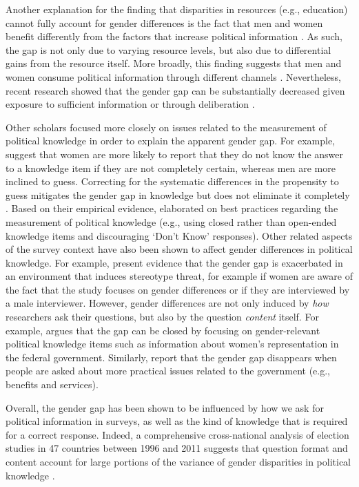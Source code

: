 \documentclass[12pt]{article}
\begin{document}
Another explanation for the finding that disparities in resources (e.g., education) cannot fully account for gender differences is the fact that men and women benefit differently from the factors that increase political information \citep{dow2009gender}. As such, the gap is not only due to varying resource levels, but also due to differential gains from the resource itself. More broadly, this finding suggests that men and women consume political information through different channels \citep[see also][]{pietryka2013analysis}. Nevertheless, recent research showed that the gender gap can be substantially decreased given exposure to sufficient information \citep[e.g.][]{jerit2017revisiting} or through deliberation \citep{fraile2014does}.

Other scholars focused more closely on issues related to the measurement of political knowledge in order to explain the apparent gender gap. For example, \citet{mondak2004knowledge} suggest that women are more likely to report that they do not know the answer to a knowledge item if they are not completely certain, whereas men are more inclined to guess. Correcting for the systematic differences in the propensity to guess mitigates the gender gap in knowledge but does not eliminate it completely \citep[see also][]{lizotte2009explaining}. Based on their empirical evidence, \citet{mondak2004knowledge} elaborated on best practices regarding the measurement of political knowledge (e.g., using closed rather than open-ended knowledge items and discouraging `Don't Know' responses). Other related aspects of the survey context have also been shown to affect gender differences in political knowledge. For example, \citet{mcglone2006stereotype} present evidence that the gender gap is exacerbated in an environment that induces stereotype threat, for example if women are aware of the fact that the study focuses on gender differences or if they are interviewed by a male interviewer. However, gender differences are not only induced by \textit{how} researchers ask their questions, but also by the question \textit{content} itself. For example, \citet{dolan2011women} argues that the gap can be closed by focusing on gender-relevant political knowledge items such as information about women's representation in the federal government. Similarly, \citet{stolle2010women} report that the gender gap disappears when people are asked about more practical issues related to the government (e.g., benefits and services).

Overall, the gender gap has been shown to be influenced by how we ask for political information in surveys, as well as the kind of knowledge that is required for a correct response. Indeed, a comprehensive cross-national analysis of election studies in 47 countries between 1996 and 2011 suggests that question format and content account for large portions of the variance of gender disparities in political knowledge \citep{fortin2016cross}.
\end{document}
